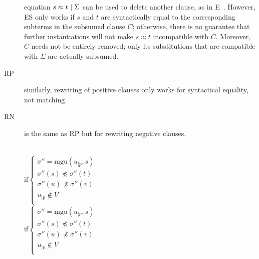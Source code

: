 \begin{description}
    equation $ s\approx t ~|~ \Sigma $ can be used to delete another clause, as
    in E~\cite{e_brainiac_prover}.
    However, ES only works if $s$ and $t$ are syntactically equal to the
    corresponding subterms in the subsumed clause $C$; otherwise, there is no
    guarantee that further instantiations will not make
    $s\approx t$ incompatible with $C$.
    Moreover, $C$ needs not be entirely removed; only its substitutions
    that are compatible with $\Sigma$ are actually subsumed.
  \item[RP] similarly, rewriting of positive clauses only  works for
    syntactical equality, not matching.
  \item[RN] is the same as RP but for rewriting negative clauses.
\end{description}

\begin{figure}[htb]
  \begin{center}

    \UIC{$\emptyset | \Sigma \circ \sigma $}
    \DP{} \\[12pt]

    \DP{}
    $\text{if} \left\{ \begin{array}{l}
        \sigma'' = \text{mgu}(u_{|p}, s) \\
        \sigma''(s) \not\preceq \sigma''(t) \\
        \sigma''(u) \not\preceq \sigma''(v) \\
        u_{|p} \not\in V \\
    \end{array}\right.$ \\[12pt]

    \DP{}
    $\text{if} \left\{ \begin{array}{l}
        \sigma'' = \text{mgu}(u_{|p}, s) \\
        \sigma''(s) \not\preceq \sigma''(t) \\
        \sigma''(u) \not\preceq \sigma''(v) \\
        u_{|p} \not\in V \\
    \end{array}\right.$ \\[12pt]


\end{center}
\end{figure}
